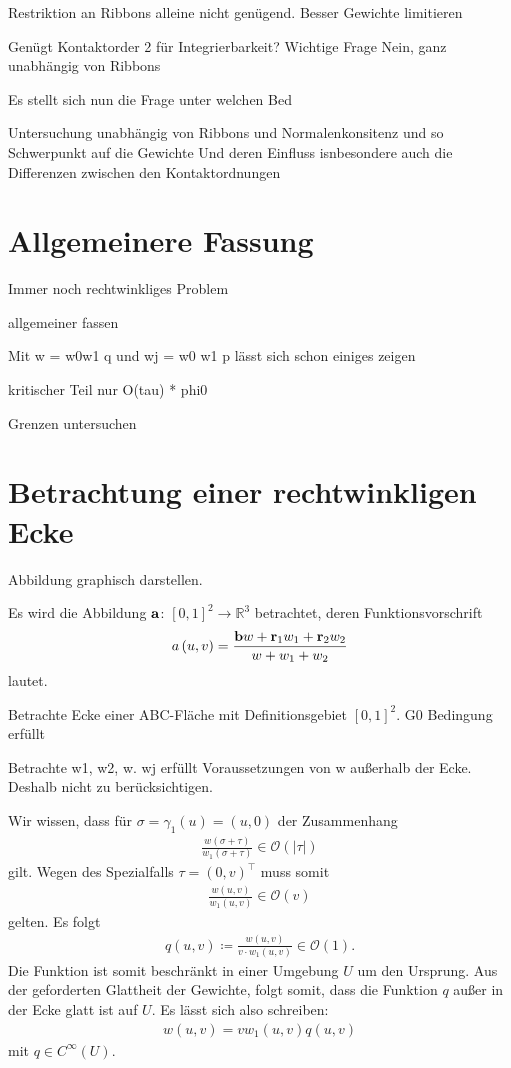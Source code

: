 \documentclass[10pt,a4paper,oneside]{report}
\newcommand{\R}{\mathbb{R}}
\newcommand{\OL}{\mathcal{O}}
\begin{document}
Restriktion an Ribbons alleine nicht genügend. 
Besser Gewichte limitieren

Genügt Kontaktorder 2 für Integrierbarkeit? Wichtige Frage
Nein, ganz unabhängig von Ribbons

Es stellt sich nun die Frage unter welchen Bed

Untersuchung unabhängig von Ribbons und Normalenkonsitenz und so
Schwerpunkt auf die Gewichte
Und deren Einfluss
isnbesondere auch die Differenzen zwischen den Kontaktordnungen


\chapter{Allgemeinere Fassung}
Immer noch rechtwinkliges Problem

allgemeiner fassen

Mit w = w0w1 q und wj = w0 w1 p lässt sich schon einiges zeigen

kritischer Teil nur O(tau) * phi0

Grenzen untersuchen

\chapter{Betrachtung einer rechtwinkligen Ecke}
Abbildung graphisch darstellen. 

Es wird die Abbildung $\bold{a}$: $\left[0,1\right]^2 \to \R^3$ betrachtet, deren Funktionsvorschrift 
\begin{align*}
a\left(u,v\right) = \frac{\bold{b} w + \bold{r}_1 w_1 + \bold{r}_2 w_2}{w+w_1+w_2}
\end{align*}
lautet.

Betrachte Ecke einer ABC-Fläche mit Definitionsgebiet $\left[0,1\right]^2$.
G0 Bedingung erfüllt

Betrachte w1, w2, w.
wj erfüllt Voraussetzungen von w außerhalb der Ecke. Deshalb nicht zu berücksichtigen.

Wir wissen, dass für $\sigma = \gamma_1\left(u\right) = \left(u,0\right)$ der Zusammenhang
\begin{align*}
\frac{w\left(\sigma + \tau\right)}{w_1\left(\sigma + \tau\right)} \in \OL\left(|\tau|\right)
\end{align*}
gilt.
Wegen des Spezialfalls $\tau = \left( 0, v\right)^{\top}$ muss somit
\begin{align*}
\frac{w\left(u,v\right)}{w_1\left(u,v\right)} \in \OL\left(v\right)
\end{align*}
gelten.
Es folgt
\begin{align*}
q\left(u,v\right) \coloneqq \frac{w\left(u,v\right)}{v \cdot w_1\left(u,v\right)} \in \OL\left(1\right).
\end{align*}
Die Funktion ist somit beschränkt in einer Umgebung $U$ um den Ursprung. 
Aus der geforderten Glattheit der Gewichte, folgt somit, dass die Funktion $q$ außer in der Ecke glatt ist auf $U$.
Es lässt sich also schreiben:
\begin{align*}
w\left(u,v\right) = v w_1\left(u,v\right) q\left(u,v\right)
\end{align*}
mit $q \in C^\infty\left(U\right)$.
\end{document}
